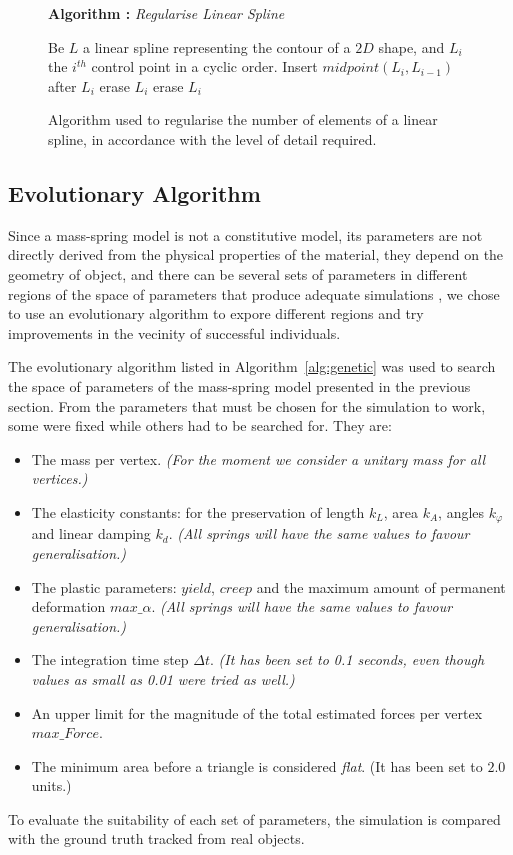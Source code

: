 \documentclass[journal]{IEEEtran}
\newcommand{\alref}[1]{Algorithm~\ref{#1}}
\newcounter{algorithm}
\newenvironment{algorithmicieee}[1]
  {\refstepcounter{algorithm}
   \begin{lrbox}{\ieeealgbox}
   \begin{minipage}{\dimexpr\columnwidth-2\fboxsep-2\fboxrule}
   \textbf{Algorithm \arabic{algorithm}:} \textit{#1} \par
   \begin{algorithmic}[1]}
  {\end{algorithmic}
   \end{minipage}
   \end{lrbox}\noindent\fbox{\usebox{\ieeealgbox}}}
\newcommand{\comment}[1]{{\color{red} #1}}
\begin{document}
\begin{figure}
 \begin{algorithmicieee}{Regularise Linear Spline}\label{alg:regularise}
 \STATE Be $L$ a linear spline representing the contour of a $2D$ shape, and $L_i$ the $i^{th}$ control point in a cyclic order.
  \STATE Insert $midpoint(L_i,L_{i-1})$ after $L_i$
  \STATE erase $L_i$
  \STATE erase $L_i$
 \ENDIF
 \ENDFOR
\end{algorithmicieee}
\caption{Algorithm used to regularise the number of elements of a linear spline, in accordance with the level of detail required.}
\end{figure}


\subsection{Evolutionary Algorithm}
\comment{Since a mass-spring model is not a constitutive model, its parameters are not directly derived from the physical properties of the material, they depend on the geometry of object, and there can be several sets of parameters in different regions of the space of parameters that produce adequate simulations \cite{Morris2008}, we chose to use an evolutionary algorithm to expore different regions and try improvements in the vecinity of successful individuals.}

The evolutionary algorithm listed in \alref{alg:genetic} was used to search the space of parameters of the mass-spring model presented in the previous section.
From the parameters that must be chosen for the simulation to work, some were fixed while others had to be searched for.  They are:
\begin{itemize}
 \item The mass per vertex.  \textit{(For the moment we consider a unitary mass for all vertices.)}
 \item The elasticity constants: for the preservation of length $k_L$, area $k_A$, angles $k_{\varphi}$ and linear damping $k_d$.  \textit{(All springs will have the same values to favour generalisation.)}
 \item The plastic parameters: $yield$, $creep$ and the maximum amount of permanent deformation $max\_\alpha$.  \textit{(All springs will have the same values to favour generalisation.)}
 \item The integration time step $\Delta t$.  \textit{(It has been set to 0.1 seconds, even though values as small as 0.01 were tried as well.)}
 \item An upper limit for the magnitude of the total estimated forces per vertex $max\_Force$.
 \item The minimum area before a triangle is considered \textit{flat}.  (It has been set to $2.0$ units.)
\end{itemize}
To evaluate the suitability of each set of parameters, the simulation is compared with the ground truth tracked from real objects.
\end{document}

